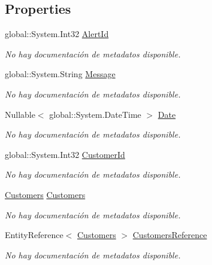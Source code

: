 \subsection*{Properties}
\begin{DoxyCompactItemize}
\item 
global\-::\-System.\-Int32 \hyperlink{class_game_memory_1_1_alerts_a6e1cbcb967beb6bf83452ffa6be8b679}{Alert\-Id}
\begin{DoxyCompactList}\small\item\em No hay documentación de metadatos disponible. \end{DoxyCompactList}\item 
global\-::\-System.\-String \hyperlink{class_game_memory_1_1_alerts_a52f59bb44b174d6c60521a9d226a4cf8}{Message}
\begin{DoxyCompactList}\small\item\em No hay documentación de metadatos disponible. \end{DoxyCompactList}\item 
Nullable$<$ global\-::\-System.\-Date\-Time $>$ \hyperlink{class_game_memory_1_1_alerts_a9f7acf9c7a5e7248df9a8c2c2f841ca9}{Date}
\begin{DoxyCompactList}\small\item\em No hay documentación de metadatos disponible. \end{DoxyCompactList}\item 
global\-::\-System.\-Int32 \hyperlink{class_game_memory_1_1_alerts_a65ef174df77f25f7e1725f53b38ba3a9}{Customer\-Id}
\begin{DoxyCompactList}\small\item\em No hay documentación de metadatos disponible. \end{DoxyCompactList}\item 
\hyperlink{class_game_memory_1_1_customers}{Customers} \hyperlink{class_game_memory_1_1_alerts_a95f4e83172bc78c6d100de58837b5949}{Customers}
\begin{DoxyCompactList}\small\item\em No hay documentación de metadatos disponible. \end{DoxyCompactList}\item 
Entity\-Reference$<$ \hyperlink{class_game_memory_1_1_customers}{Customers} $>$ \hyperlink{class_game_memory_1_1_alerts_a413ffe3f68f3c9e23cef4d542106fd97}{Customers\-Reference}
\begin{DoxyCompactList}\small\item\em No hay documentación de metadatos disponible. \end{DoxyCompactList}\end{DoxyCompactItemize}


